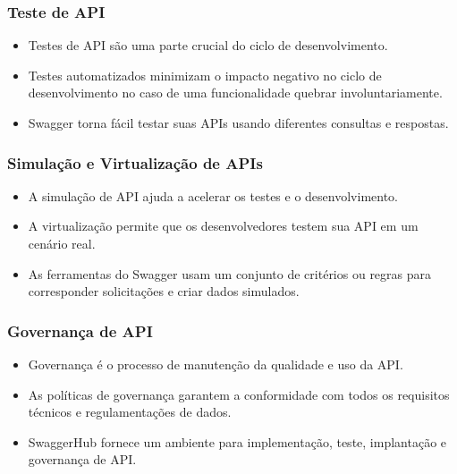 \documentclass{beamer}
\begin{document}
\begin{frame}
\frametitle{Teste de API}


\begin{itemize}
\item Testes de API são uma parte crucial do ciclo de desenvolvimento.
\item Testes automatizados minimizam o impacto negativo no ciclo de desenvolvimento no caso de uma funcionalidade quebrar involuntariamente.
\item Swagger torna fácil testar suas APIs usando diferentes consultas e respostas.
\end{itemize}

\end{frame}

\begin{frame}
\frametitle{Simulação e Virtualização de APIs}


\begin{itemize}
\item A simulação de API ajuda a acelerar os testes e o desenvolvimento.
\item A virtualização permite que os desenvolvedores testem sua API em um cenário real.
\item As ferramentas do Swagger usam um conjunto de critérios ou regras para corresponder solicitações e criar dados simulados.
\end{itemize}

\end{frame}

\begin{frame}
\frametitle{Governança de API}


\begin{itemize}
\item Governança é o processo de manutenção da qualidade e uso da API.
\item As políticas de governança garantem a conformidade com todos os requisitos técnicos e regulamentações de dados.
\item SwaggerHub fornece um ambiente para implementação, teste, implantação e governança de API.
\end{itemize}

\end{frame}
\end{document}
